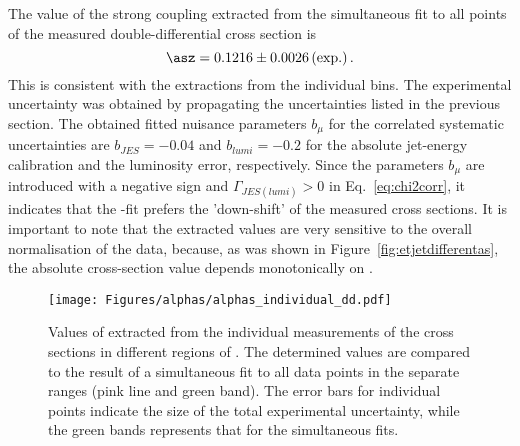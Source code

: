 The value of the strong coupling extracted from the simultaneous fit to all points of the measured double-differential cross section is
\begin{equation}
 \asz = 0.1216 \pm 0.0026 \left( \text{exp.} \right). %
 \label{eq:asdoubledifval}
\end{equation}
This is consistent with the extractions from the individual \qsq bins. The experimental uncertainty was obtained by propagating the uncertainties listed in the previous section. The obtained fitted nuisance parameters $b_{\mu}$ for the correlated systematic uncertainties are $b_{JES}=-0.04$ and $b_{lumi}=-0.2$ for the absolute jet-energy calibration and the luminosity error, respectively. Since the parameters $b_{\mu}$ are introduced with a negative sign and $\Gamma_{JES\left(lumi\right)}>0$ in Eq.~\eqref{eq:chi2corr}, it indicates that the \as-fit prefers the 'down-shift' of the measured cross sections. It is important to note that the extracted \as values are very sensitive to the overall normalisation of the data, because, as was shown in Figure~\ref{fig:etjetdifferentas}, the absolute cross-section value depends monotonically on \asz.

\begin{figure}[p]
 \centering
 \texttt{[image: Figures/alphas/alphas\_individual\_dd.pdf]}
 \caption{Values of \asz extracted from the individual measurements of the \dsdetjetb cross sections in different regions of \qsq. The determined values are compared to the result of a simultaneous fit to all data points in the separate \qsq ranges (pink line and green band). The error bars for individual points indicate the size of the total experimental uncertainty, while the green bands represents that for the simultaneous fits.}
 \label{fig:asindividual_dd}
\end{figure}

% 
